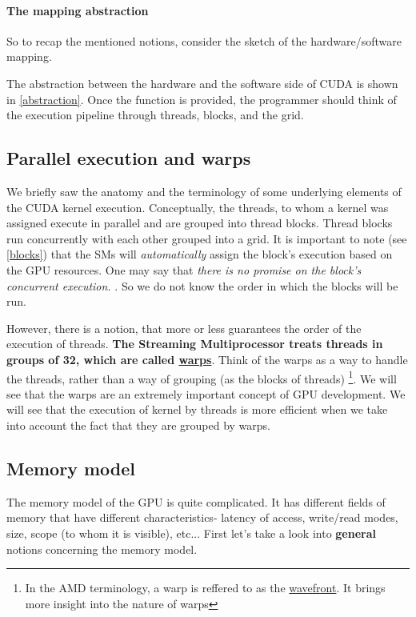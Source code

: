 \vspace{-18pt}
\paragraph{The mapping abstraction} So to recap the mentioned notions, consider the 
sketch of the hardware/software mapping.

The abstraction between the hardware and the software side of CUDA is shown in \autoref{abstraction}. Once the function 
is provided, the programmer should think of the execution pipeline through threads, blocks, and the grid.

\clearpage
\newpage
\subsection{Parallel execution and warps}
\label{warps}
We briefly saw the anatomy and the terminology of some underlying elements of the CUDA kernel execution.
Conceptually, the threads, to whom a kernel was assigned execute in parallel and are grouped into thread blocks.
Thread blocks run concurrently with each other grouped into a grid. It is important to note (see \autoref{blocks}) that 
the SMs will \textit{automatically} assign the block's execution based on the GPU resources. One may say that 
\textsl{
there is no promise on the block's concurrent execution.
}\cite{tuomanen2018hands}. So we do not know the order in which the blocks will be run.


However, there is a notion, that more or less guarantees the order of the execution of threads. 
\textbf{The Streaming Multiprocessor
treats threads in groups of 32, which are called \underline{warps}}. Think of the warps as a way to handle 
the threads, rather than 
a way of grouping (as the blocks of threads) \footnote{In the AMD terminology, a warp is reffered to as the 
\underline{wavefront}. It brings more insight into the nature of warps}.
We will see that the warps are an extremely important concept of GPU development. 
We will see that the execution of kernel by threads is more efficient when we take into account the fact that 
they are grouped by warps.

\subsection{Memory model}
The memory model of the GPU is quite complicated. It has different fields of memory that have different characteristics-
latency of access, write/read modes, size, scope (to whom it is visible), etc... First let's take a look into \textbf{general}
notions concerning the memory model.
\vspace{-15pt}

